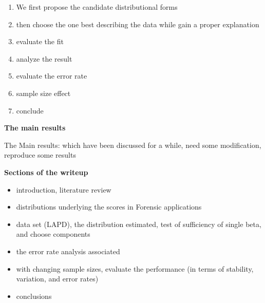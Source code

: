 \documentclass[12pt]{article}         %
\begin{document}
\begin{enumerate}
\item We first propose the candidate distributional forms
\item then choose the one best describing the data while gain a proper explanation
\item evaluate the fit
\item analyze the result
\item evaluate the error rate
\item sample size effect
\item conclude
\end{enumerate}

\textbf {The main results}

\bigskip

The Main results: which have been discussed for a while, need some modification, reproduce some results

\bigskip

\textbf {Sections of the writeup}

\begin{itemize}
  \item introduction, literature review
  \item distributions underlying the scores in Forensic applications
  \item data set (LAPD), the distribution estimated, test of sufficiency of single beta, and choose components
  \item the error rate analysis associated
  \item with changing sample sizes, evaluate the performance (in terms of stability, variation, and error rates)
  \item conclusions
\end{itemize}
\end{document}
